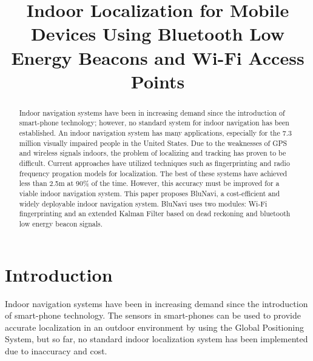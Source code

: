 \documentclass[conference]{IEEEtran}
\begin{document}
\title{Indoor Localization for Mobile Devices Using Bluetooth Low Energy Beacons and Wi-Fi Access Points}

\author{
\and
{}
\and
{}
}

\maketitle

\begin{abstract}
Indoor navigation systems have been in increasing demand since the introduction of smart-phone technology; however, no standard system for indoor navigation has been established. An indoor navigation system has many applications, especially for the 7.3 million visually impaired people in the United States. Due to the weaknesses of GPS and wireless signals indoors, the problem of localizing and tracking has proven to be difficult. Current approaches have utilized techniques such as fingerprinting and radio frequency progation models for localization. The best of these systems have achieved less than 2.5m at 90\% of the time. However, this accuracy must be improved for a viable indoor navigation system. This paper proposes BluNavi, a cost-efficient and widely deployable indoor navigation system. BluNavi uses two modules: Wi-Fi fingerprinting and an extended Kalman Filter based on dead reckoning and bluetooth low energy beacon signals.
\end{abstract}


\section{Introduction}
Indoor navigation systems have been in increasing demand since the introduction of smart-phone technology. The sensors in smart-phones can be used to provide accurate localization in an outdoor environment by using the Global Positioning System, but so far, no standard indoor localization system has been implemented due to inaccuracy and cost.
\end{document}
